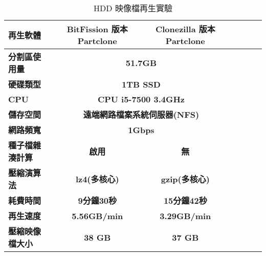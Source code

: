 \begin{table}[htbp]
\centering
\caption{HDD 映像檔再生實驗}
\label{pcspec}
\begin{adjustbox}{max width=0.92\textwidth}
\begin{tabular}{lcccccc}

\toprule
\multicolumn{1}{l}{\textbf{再生軟體}} & \textbf{BitFission 版本 Partclone} & \textbf{Clonezilla 版本 Partclone} \\ \midrule
\multicolumn{1}{l}{\textbf{分割區使用量}} & \multicolumn{2}{c}{\textbf{51.7GB}} \\

\multicolumn{1}{l}{\textbf{硬碟類型}} & \multicolumn{2}{c}{\textbf{1TB SSD}} \\

\multicolumn{1}{l}{\textbf{CPU}} & \multicolumn{2}{c}{\textbf{CPU i5-7500 3.4GHz}} \\

\multicolumn{1}{l}{\textbf{儲存空間}} & \multicolumn{2}{c}{\textbf{遠端網路檔案系統伺服器(NFS)}} \\

\multicolumn{1}{l}{\textbf{網路頻寬}} & \multicolumn{2}{c}{\textbf{1Gbps}} \\

\multicolumn{1}{l}{\textbf{種子檔雜湊計算}} & \textbf{啟用} & \textbf{無} \\

\multicolumn{1}{l}{\textbf{壓縮演算法}} & \textbf{lz4(多核心)} & \textbf{gzip(多核心)} \\

\multicolumn{1}{l}{\textbf{耗費時間}} & \textbf{9分鐘30秒} & \textbf{15分鐘42秒} \\

\multicolumn{1}{l}{\textbf{再生速度}} & \textbf{5.56GB/min} & \textbf{3.29GB/min} \\

\multicolumn{1}{l}{\textbf{壓縮映像檔大小}} & \textbf{38 GB} & \textbf{37 GB} \\

\bottomrule
\end{tabular}
\end{adjustbox}
\end{table}
